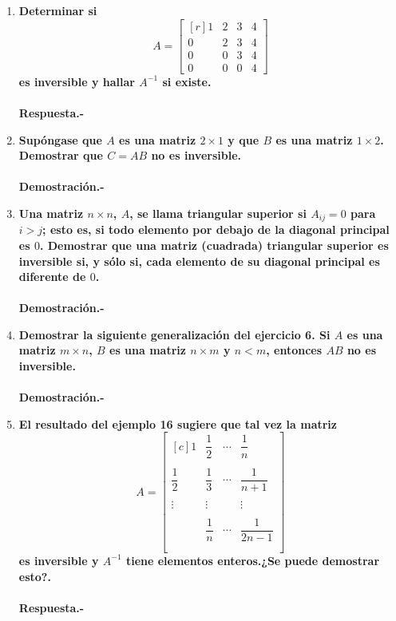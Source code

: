 \begin{enumerate}
    \item \textbf{\boldmath Determinar si
	$$A=\begin{bmatrix*}[r]
	    1&2&3&4\\
	    0&2&3&4\\
	    0&0&3&4\\
	    0&0&0&4
	\end{bmatrix*}$$
	es inversible y hallar $A^{-1}$ si existe.\\\\
	Respuesta.-}\;

    \item \textbf{\boldmath Supóngase que $A$ es una matriz $2\times 1$ y que $B$ es una matriz $1\times 2$. Demostrar que $C=AB$ no es inversible.\\\\
	Demostración.-}\;

    \item \textbf{\boldmath Una matriz $n\times n$, $A$, se llama triangular superior si $A_{ij}=0$ para $i>j$; esto es, si todo elemento por debajo de la diagonal principal es $0$. Demostrar que una matriz (cuadrada) triangular superior es inversible si, y sólo si, cada elemento de su diagonal principal es diferente de $0$.\\\\
	Demostración.-}\;

    \item \textbf{\boldmath Demostrar la siguiente generalización del ejercicio 6. Si $A$ es una matriz $m\times n$, $B$ es una matriz $n\times m$ y $n<m$, entonces $AB$ no es inversible.\\\\
	Demostración.-}\;

    \item \textbf{\boldmath El resultado del ejemplo 16 sugiere que tal vez la matriz
	$$A=\begin{bmatrix*}[c]
	    1&\dfrac{1}{2}&\cdots&\dfrac{1}{n}\\\\
	    \dfrac{1}{2}&\dfrac{1}{3}&\cdots&\dfrac{1}{n+1}\\\\
	    \vdots&\vdots&&\vdots\\\\
		  &\dfrac{1}{n}&\cdots&\dfrac{1}{2n-1}\\\\
	\end{bmatrix*}$$
    es inversible y $A^{-1}$ tiene elementos enteros.¿Se puede demostrar esto?.\\\\
	Respuesta.-}\;


\end{enumerate}
